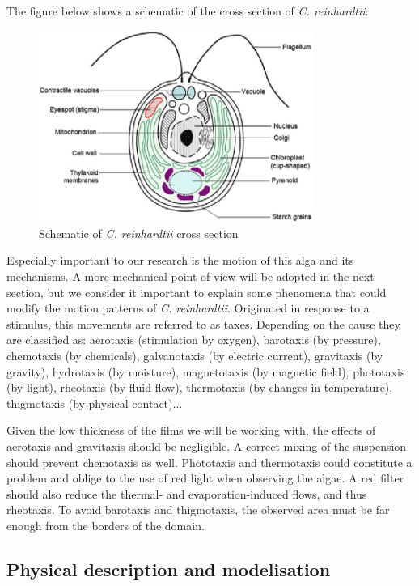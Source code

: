 The figure below shows a schematic of the cross section of \textit{C. reinhardtii}:

\begin{figure}[H]
	\centering
	\includegraphics[width=0.8\textwidth]{archivos/chlamy_illustration.png}
	\caption{Schematic of \textit{C. reinhardtii} cross section~\cite{chlamy_cs}
	}
	\label{chlamy_illustration}
\end{figure}

Especially important to our research is the motion of this alga and its mechanisms. A more mechanical point of view will be adopted in the next section, but we consider it important to explain some phenomena that could modify the motion patterns of \textit{C. reinhardtii}. Originated in response to a stimulus, this movements are referred to as taxes. Depending on the cause they are classified as: aerotaxis (stimulation by oxygen), barotaxis (by pressure), chemotaxis (by chemicals), galvanotaxis (by electric current), gravitaxis (by gravity), hydrotaxis (by moisture), magnetotaxis (by magnetic field), phototaxis (by light), rheotaxis (by fluid flow), thermotaxis (by changes in temperature), thigmotaxis (by physical contact)...

Given the low thickness of the films we will be working with, the effects of aerotaxis and gravitaxis should be negligible. A correct mixing of the suspension should prevent chemotaxis as well. Phototaxis and thermotaxis could constitute a problem and oblige to the use of red light when observing the algae. A red filter should also reduce the thermal- and evaporation-induced flows, and thus rheotaxis. To avoid barotaxis and thigmotaxis, the observed area must be far enough from the borders of the domain.

\subsection{Physical description and modelisation}

